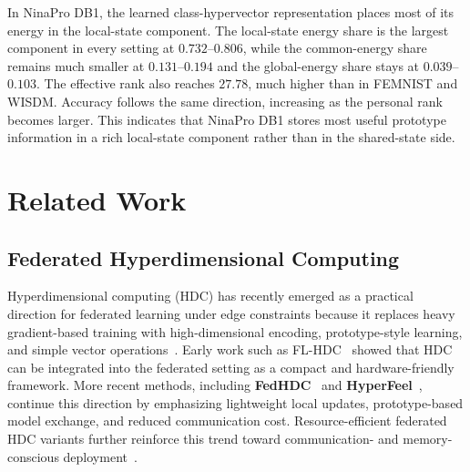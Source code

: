 \documentclass[lettersize,journal]{IEEEtran}
\newcommand{\rev}[1]{#1}
\begin{document}
In NinaPro DB1, the learned class-hypervector representation places most of its energy in the \rev{local-state component}.
The \rev{local-state energy share} is the largest component in every setting at \(0.732\)--\(0.806\), while the common-energy share remains much smaller at \(0.131\)--\(0.194\) and the global-energy share stays at \(0.039\)--\(0.103\).
The effective rank also reaches \(27.78\), much higher than in FEMNIST and WISDM.
Accuracy follows the same direction, increasing as the personal rank becomes larger. 
This indicates that NinaPro DB1 stores most useful prototype information in a rich \rev{local-state component rather than in the shared-state side}.





\section{Related Work}

\subsection{Federated Hyperdimensional Computing}

Hyperdimensional computing (HDC) has recently emerged as a practical direction for federated learning under edge constraints because it replaces heavy gradient-based training with high-dimensional encoding, prototype-style learning, and simple vector operations~\cite{Kleyko_2023, heddes2024hyperdimensional}.
Early work such as FL-HDC~\cite{flhdc2021hsieh} showed that HDC can be integrated into the federated setting as a compact and hardware-friendly framework.
More recent methods, including \textbf{FedHDC}~\cite{ergun2023federatedhyperdimensionalcomputing} and \textbf{HyperFeel}~\cite{li2024hyperfeel}, continue this direction by emphasizing lightweight local updates, prototype-based model exchange, and reduced communication cost.
Resource-efficient federated HDC variants further reinforce this trend toward communication- and memory-conscious deployment~\cite{zeulin2023resourceefficientfederatedhyperdimensionalcomputing}.
\end{document}
